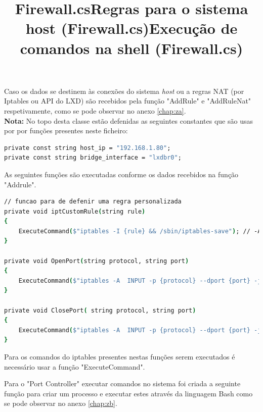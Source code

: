 \title*{\textbf{Firewall.cs}}

Caso os dados se destinem às conexões do sistema \textit{host} ou a regras NAT 
(por Iptables ou API do LXD) são recebidos pela função "AddRule" e "AddRuleNat" 
respetivamente, como se pode observar no anexo \ref{chap:za}. \\


\textbf{Nota:} No topo desta classe estão defenidas as seguintes constantes que são usas por
por funções presentes neste ficheiro:

\begin{lstlisting}[language=csh, caption={Constantes defenidas}]
private const string host_ip = "192.168.1.80";
private const string bridge_interface = "lxdbr0";
\end{lstlisting} 

    
    
    

\title*{\textbf{Regras para o sistema host (Firewall.cs)}}

As seguintes funções são executadas conforme os dados recebidos na função "Addrule".

\begin{lstlisting}[language=csh, caption={Funções para executar regras no Iptables}]
// funcao para de defenir uma regra personalizada 
private void iptCustomRule(string rule)
{
    ExecuteCommand($"iptables -I {rule} && /sbin/iptables-save"); // -A para adicionar no fundo da lista ou -I para adicionar ao topo da lista
}

private void OpenPort(string protocol, string port)
{
    ExecuteCommand($"iptables -A  INPUT -p {protocol} --dport {port} -j ACCEPT && /sbin/iptables-save");
}

private void ClosePort( string protocol, string port)
{
    ExecuteCommand($"iptables -A  INPUT -p {protocol} --dport {port} -j DROP && /sbin/iptables-save");
}
\end{lstlisting} 


Para os comandos do iptables presentes nestas funções serem executados é necessário
usar a função "ExecuteCommand". \\




\title*{\textbf{Execução de comandos na shell (Firewall.cs)}}


Para o "Port Controller" executar comandos no sistema foi criada a seguinte função
para criar um processo e executar estes através da linguagem Bash como se pode 
observar no anexo \ref{chap:zb}. \\






